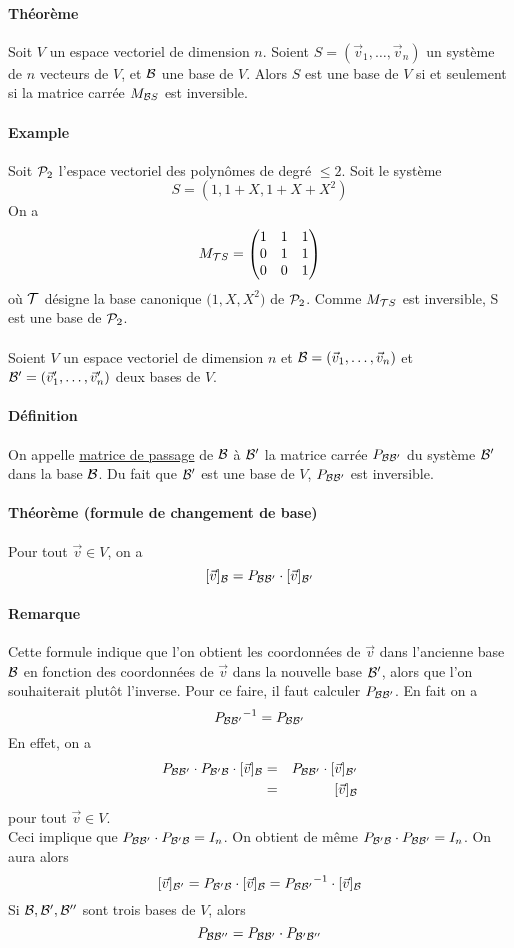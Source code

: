 {\paragraph{Théorème} Soit $V$ un espace vectoriel de dimension $n$. Soient $S = (\vec{v}_1, \ldots, \vec{v}_n)$ un système de $n$ vecteurs de $V$, et $\mathcal{B}$ une base de $V$. Alors $S$ est une base de $V$ si et seulement si la matrice carrée $M_{\mathcal{B} S}$ est inversible.

\paragraph{Example} Soit $\mathcal{P}_2$ l'espace vectoriel des polynômes de degré $\leq 2$. Soit le système
$$S = (1, 1 + X, 1 + X + X^2)$$
On a 
$$M_{\mathcal{T} S} = \begin{pmatrix}
  1 & 1 & 1 \\
  0 & 1 & 1 \\
  0 & 0 & 1
\end{pmatrix}$$
où $\mathcal{T}$ désigne la base canonique $\big(1, X, X^2 \big)$ de $\mathcal{P}_2$. Comme $M_{\mathcal{T} S}$ est inversible, S est une base de $\mathcal{P}_2$.
\\\\
Soient $V$ un espace vectoriel de dimension $n$ et $\mathcal{B} = (\vec{v}_1, \ldots, \vec{v}_n)$ et $\mathcal{B}' = (\vec{v}'_1, \ldots, \vec{v}'_n)$ deux bases de $V$.
\paragraph{Définition} On appelle \underline{matrice de passage} de $\mathcal{B}$ à $\mathcal{B}'$ la matrice carrée $P_{\mathcal{B} \mathcal{B}'}$ du système $\mathcal{B}'$ dans la base $\mathcal{B}$. Du fait que $\mathcal{B}'$ est une base de $V$, $P_{\mathcal{B} \mathcal{B}'}$ est inversible.

\paragraph{Théorème (formule de changement de base)} Pour tout $\vec{v} \in V$, on a 
$$[\vec{v}]_{\mathcal{B}} = P_{\mathcal{B} \mathcal{B}'} \cdot [\vec{v}]_{\mathcal{B}'}$$

\paragraph{Remarque} Cette formule indique que l'on obtient les coordonnées de $\vec{v}$ dans l'ancienne base $\mathcal{B}$ en fonction des coordonnées de $\vec{v}$ dans la nouvelle base $\mathcal{B}'$, alors que l'on souhaiterait plutôt l'inverse. Pour ce faire, il faut calculer $P_{\mathcal{B} \mathcal{B}'}$. En fait on a
$${P_{\mathcal{B} \mathcal{B}'}}^{-1} = P_{\mathcal{B} \mathcal{B}'}$$
En effet, on a
\begin{eqnarray*}
  P_{\mathcal{B} \mathcal{B}'} \cdot P_{\mathcal{B}' \mathcal{B}} \cdot [\vec{v}]_{\mathcal{B}} &=& P_{\mathcal{B} \mathcal{B}'} \cdot [\vec{v}]_{\mathcal{B}'} \\
   &=& [\vec{v}]_{\mathcal{B}}
\end{eqnarray*}
pour tout $\vec{v} \in V$. \\
Ceci implique que $P_{\mathcal{B} \mathcal{B}'} \cdot P_{\mathcal{B}' \mathcal{B}} = I_n$. On obtient de même $P_{\mathcal{B}' \mathcal{B}} \cdot P_{\mathcal{B} \mathcal{B}'} = I_n$. On aura alors
$$[\vec{v}]_{\mathcal{B}'} = P_{\mathcal{B}' \mathcal{B}} \cdot [\vec{v}]_{\mathcal{B}} = {P_{\mathcal{B} \mathcal{B}'}}^{-1} \cdot [\vec{v}]_{\mathcal{B}}$$
Si $\mathcal{B}, \mathcal{B}', \mathcal{B}''$ sont trois bases de $V$, alors
$$P_{\mathcal{B} \mathcal{B}''} = P_{\mathcal{B} \mathcal{B}'} \cdot P_{\mathcal{B}' \mathcal{B}''}$$

}
